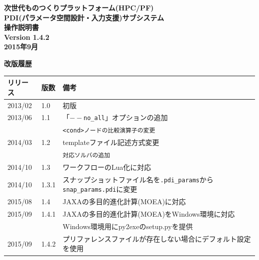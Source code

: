 \documentclass[a4paper,11pt]{jarticle}
\begin{document}
\begin{titlepage}
\vspace*{7cm}
\begin{center}%
{\LARGE \bf 次世代ものつくりプラットフォーム(HPC/PF)\\

PDI(パラメータ空間設計・入力支援)サブシステム\\

操作説明書\\}
\vspace*{2.5cm}
\bf Version 1.4.2\\
\vspace*{3.5cm}
\vspace*{1cm}
\vspace*{2cm}
\bf 2015年9月\\
\end{center}
\end{titlepage}


\newpage

{\Large\bf 改版履歴}

\vspace{12pt}
\begin{tabular}{|l|l|l|} \hline
リリース & 版数 & 備考\hspace*{11cm}\\ \hline
2013/02 & 1.0 & 初版\\ \hline
2013/06 & 1.1 & 「{\tt $--$no\_all}」オプションの追加\\
 & & {\tt <cond>ノードの比較演算子の変更}\\ \hline
2014/03 & 1.2 & templateファイル記述方式変更\\
 & & {\tt 対応ソルバの追加}\\ \hline
2014/10 & 1.3 & ワークフローのLua化に対応\\ \hline
2014/10 & 1.3.1 & スナップショットファイル名を{\tt .pdi\_params}から{\tt snap\_params.pdi}に変更\\ \hline
2015/08 & 1.4 & JAXAの多目的進化計算(MOEA)に対応\\ \hline
2015/09 & 1.4.1 & JAXAの多目的進化計算(MOEA)をWindows環境に対応\\
 & & Windows環境用にpy2exeのsetup.pyを提供\\ \hline
2015/09 & 1.4.2 & プリファレンスファイルが存在しない場合にデフォルト設定を使用\\ \hline
\end{tabular}
\end{document}
